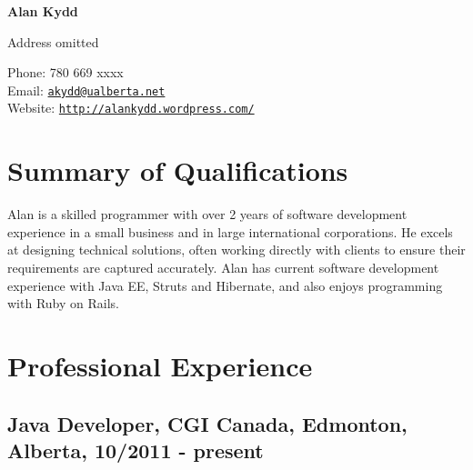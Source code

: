 \documentclass[10.5pt, letterpaper]{article}
\def\name{Alan Kydd}
\begin{document}
{\huge\bf\name}


\vspace{0.25in}

\begin{minipage}{0.45\linewidth}
  Address omitted
\end{minipage}
\begin{minipage}{0.45\linewidth}
  Phone: 780 669 xxxx \\
  Email: \href{mailto:akydd@ualberta.net}{\tt akydd@ualberta.net} \\
  Website: \href{http://alankydd.wordpress.com/}{\tt http://alankydd.wordpress.com/}
\end{minipage}


\section*{Summary of Qualifications}
Alan is a skilled programmer with over 2 years of software development experience
in a small business and in large international corporations.   He excels at
designing technical solutions, often working directly with clients to ensure
their requirements are captured accurately.  Alan has current software development
experience with Java EE, Struts and Hibernate, and also enjoys programming
with Ruby on Rails.

 

\begin{comment}
\section*{Objective}
Work as a developer on a multi-tiered web application
\end{comment}

\section*{Professional Experience}

\subsection*{Java Developer, CGI Canada, Edmonton, Alberta, 10/2011 - present}
\end{document}

